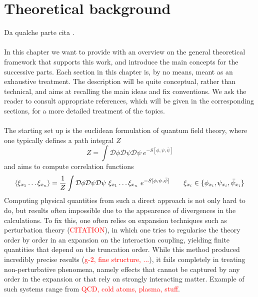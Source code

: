 \chapter{Theoretical background}
\label{chap:background}

Da qualche parte cita \cite{carosso2020novel}. \\~\\
In this chapter we want to provide with an overview on the general theoretical framework that supports this work, and introduce the main concepts for the successive parts. Each section in this chapter is, by no means, meant as an exhaustive treatment. The description will be quite conceptual, rather than technical, and aims at recalling the main ideas and fix conventions. We ask the reader to consult appropriate references,  which will be given in the corresponding sections, for a more detailed treatment of the topics. \\~\\
The starting set up is the euclidean formulation of quantum field theory, where one typically defines a path integral $Z$
\begin{equation}
    Z = \int \mathcal{D}\phi\mathcal{D}\psi\mathcal{D}\psi \ e^{-S[\phi, \psi, \bar\psi]}
    \label{eq:path_integral_generic}
\end{equation}
and aims to compute correlation functions
\begin{equation*}
        \left\langle \xi_{x_1} \dots \xi_{x_n}  \right\rangle = \frac{1}{Z} \int \mathcal{D}\phi\mathcal{D}\psi\mathcal{D}\psi \ \xi_{x_1} \dots \xi_{x_n} \ e^{-S[\phi, \psi, \bar\psi]} \qquad \xi_{x_i} \in \{\phi_{x_i}, \psi_{x_i}, \bar\psi_{x_i}\} \\
\end{equation*}
Computing physical quantities from such a direct approach is not only hard to do, but results often impossible due to the appearence of divergences in the calculations. To fix this, one often relies on expansion techniques such as perturbation theory (\textcolor{red}{CITATION}), in which one tries to regularise the theory order by order in an expansion on the interaction coupling, yielding finite quantities that depend on the truncation order.  While this method produced incredibly precise results (\textcolor{red}{g-2, fine structure, ...}), it fails completely in treating non-perturbative phenomena, namely effects that cannot be captured by any order in the expansion or that rely on strongly interacting matter. Example of such systems range from \textcolor{red}{QCD, cold atoms, plasma, stuff}. 
